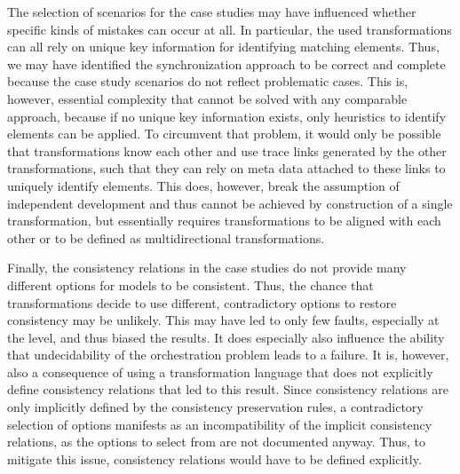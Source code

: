 
The selection of scenarios for the case studies may have influenced whether specific kinds of mistakes can occur at all.
In particular, the used transformations can all rely on unique key information for identifying matching elements.
Thus, we may have identified the synchronization approach to be correct and complete because the case study scenarios do not reflect problematic cases.
This is, however, essential complexity that cannot be solved with any comparable approach, because if no unique key information exists, only heuristics to identify elements can be applied.
To circumvent that problem, it would only be possible that transformations know each other and use trace links generated by the other transformations, such that they can rely on meta data attached to these links to uniquely identify elements.
This does, however, break the assumption of independent development and thus cannot be achieved by construction of a single transformation, but essentially requires transformations to be aligned with each other or to be defined as multidirectional transformations.

Finally, the consistency relations in the case studies do not provide many different options for models to be consistent.
Thus, the chance that transformations decide to use different, contradictory options to restore consistency may be unlikely.
This may have led to only few faults, especially at the \levelnetworkrule level, and thus biased the results.
It does especially also influence the ability that undecidability of the orchestration problem leads to a failure.
It is, however, also a consequence of using a transformation language that does not explicitly define consistency relations that led to this result.
Since consistency relations are only implicitly defined by the consistency preservation rules, a contradictory selection of options manifests as an incompatibility of the implicit consistency relations, as the options to select from are not documented anyway.
Thus, to mitigate this issue, consistency relations would have to be defined explicitly.


